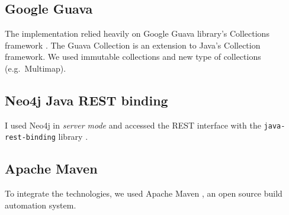 \subsection{Google Guava}

The implementation relied heavily on Google Guava library's Collections framework \cite{guava}. The Guava Collection is an extension to Java's Collection framework. We used immutable collections and new type of collections (e.g.\ Multimap).

\subsection{Neo4j Java REST binding}

I used Neo4j in \textit{server mode} and accessed the REST interface with the \texttt{java-rest-binding} library \cite{restbinding}.

\subsection{Apache Maven}

To integrate the technologies, we used Apache Maven \cite{Maven}, an open source build automation system.

